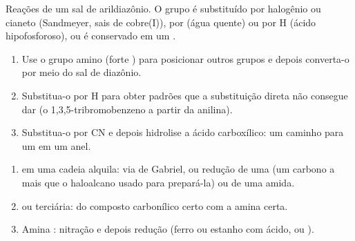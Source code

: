 \begin{omfigure}

{\small Reações de um sal de arildiazônio. O grupo  é substituído por
halogênio ou cianeto (Sandmeyer, sais de cobre(I)), por  (água quente)
ou por H (ácido hipofosforoso), ou é conservado em um .}
\end{omfigure}

\begin{method}\label{met:b2:amines:diazonium-routes}
\begin{enumerate}
  \item Use o grupo amino (forte ) para posicionar outros
        grupos e depois converta-o por meio do sal de diazônio.
  \item Substitua-o por H para obter padrões que a substituição direta não
        consegue dar (o 1,3,5-tribromobenzeno a partir da anilina).
  \item Substitua-o por CN e depois hidrolise a ácido carboxílico: um caminho
        para um  em um anel.
\end{enumerate}
\end{method}

\begin{method}\label{met:b2:amines:make-amine}
\begin{enumerate}
  \item {} em uma cadeia alquila: via de Gabriel, ou redução de
        uma  (um carbono a mais que o haloalcano usado para prepará-la)
        ou de uma amida.
  \item {} ou terciária:  do composto
        carbonílico certo com a amina certa.
  \item Amina : nitração e depois redução (ferro ou estanho com
        ácido, ou ).
\end{enumerate}
\end{method}


